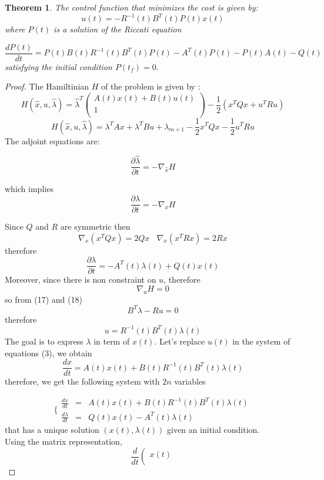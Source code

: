 \documentclass[12pt]{article}
\newtheorem{theorem}{Theorem}
\begin{document}
\begin{theorem}
The control function that minimizes the cost is given  by:
 $$u(t)=-R^{-1}(t)B^T(t)P(t)x(t)$$
where  $P(t)$ is a solution of the Riccati equation

\begin{equation}
    \frac{dP(t)}{dt}=P(t)B(t)R^{-1}(t)B^T(t)P(t)-A^T(t)P(t)-P(t)A(t)-Q(t)
\end{equation}
satisfying the initial condition $P(t_f)=0.$ 
\end{theorem}
\begin{proof}
The Hamiltinian $H$ of the problem is given by :
\begin{equation}
H(\hat{x},u,\hat{\lambda})=\hat{\lambda}^T \left(\begin{array}{c}
  A(t)x(t)+B(t)u(t)      \\
1\\   
\end{array}\right)-\frac{1}{2}(x^TQx+u^TRu)
\end{equation}
\begin{equation}
H(\hat{x},u,\hat{\lambda})=\lambda^TAx+\lambda^TBu+\lambda_{m+1}-\frac{1}{2}x^TQx-\frac{1}{2}u^TRu
\end{equation}
The adjoint equations are:

$$\frac{\partial \hat{\lambda}}{\partial t}=-\nabla_{\hat{x} }H$$

which implies
$$\frac{\partial \lambda}{\partial t}=-\nabla_x H$$

Since $Q$ and $R$ are symmetric then
$$\nabla_x(x^TQx)=2Qx \ \ \ \  \nabla_x(x^TRx)=2Rx$$
therefore
$$\frac{\partial\lambda }{\partial t}=-A^T(t)\lambda(t)+Q(t)x(t)$$
Moreover, since there is non constraint on $u$, therefore 
\begin{equation}
\nabla _u H=0 
\end{equation}
so from (17) and  (18) 
\begin{equation}
    B^T\lambda-Ru=0
\end{equation}
therefore 
\begin{equation}
u=R^{-1}(t)B^T(t)\lambda(t)
\end{equation}
The goal is to express $\lambda$ in term of $x(t)$. Let's replace  $u(t)$ in the system of equations (3), we obtain
\begin{equation}
    \frac{dx}{dt}=A(t)x(t)+B(t)R^{-1}(t)B^T(t)\lambda(t)
\end{equation}
therefore, we get the following system with $2n$ variables

\begin{equation}
\{ \begin{array}{ccc} \frac{dx}{dt}&=& A(t)x(t)+B(t)R^{-1}(t)B^T(t)\lambda(t)\\
 \frac{d\lambda}{dt}&=&Q(t)x(t)-A^T(t)\lambda(t)\end{array}
\end{equation}
that has a unique solution $(x(t),\lambda(t))$  given an initial condition.\\
Using the matrix representation,
\begin{equation}
    \frac{d}{dt} \left ( \begin{array}{c} x(t)\\


\end{array}
\end{equation}
\end{proof}
\end{document}
